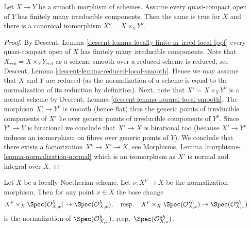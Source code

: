 \begin{lemma}
\label{lemma-normalization-and-smooth}
Let $X \to Y$ be a smooth morphism of schemes. Assume every quasi-compact
open of $Y$ has finitely many irreducible components. Then the same
is true for $X$ and there is a canonical isomorphism
$X^\nu = X \times_Y Y^\nu$.
\end{lemma}

\begin{proof}
By Descent, Lemma \ref{descent-lemma-locally-finite-nr-irred-local-fppf}
every quasi-compact open of $X$ has finitely many irreducible components.
Note that $X_{red} = X \times_Y Y_{red}$ as a scheme smooth over a reduced
scheme is reduced, see
Descent, Lemma \ref{descent-lemma-reduced-local-smooth}.
Hence we may assume that $X$ and $Y$ are reduced (as the normalization
of a scheme is equal to the normalization of its reduction by
definition). Next, note that $X' = X \times_Y Y^\nu$ is a normal scheme
by Descent, Lemma \ref{descent-lemma-normal-local-smooth}.
The morphism $X' \to Y^\nu$ is smooth (hence flat) thus the generic
points of irreducible components of $X'$ lie over generic points of
irreducible components of $Y^\nu$. Since $Y^\nu \to Y$ is birational
we conclude that $X' \to X$ is birational too (because $X' \to Y^\nu$
induces an isomorphism on fibres over generic points of $Y$).
We conclude that there exists a factorization
$X^\nu \to X' \to X$, see
Morphisms, Lemma \ref{morphisms-lemma-normalization-normal}
which is an isomorphism as $X'$ is normal and integral over $X$.
\end{proof}

\begin{lemma}
\label{lemma-normalization-and-henselization}
Let $X$ be a locally Noetherian scheme. Let $\nu : X^\nu \to X$
be the normalization morphism. Then for any point $x \in X$
the base change
$$
X^\nu \times_X \Spec(\mathcal{O}_{X, x}^h) \to \Spec(\mathcal{O}_{X, x}^h),
\quad\text{resp.}\quad
X^\nu \times_X \Spec(\mathcal{O}_{X, x}^{sh}) \to \Spec(\mathcal{O}_{X, x}^{sh})
$$
is the normalization of $\Spec(\mathcal{O}_{X, x}^h)$,
resp.\ $\Spec(\mathcal{O}_{X, x}^{sh})$.
\end{lemma}

